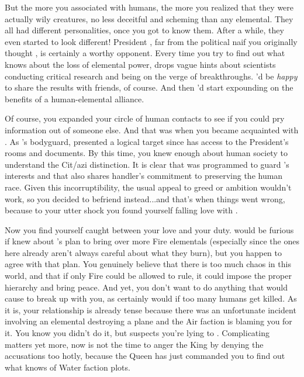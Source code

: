 \documentclass[char]{elementals}
\begin{document}
But the more you associated with humans, the more you realized that they were actually wily creatures, no less deceitful and scheming than any elemental.  They all had different personalities, once you got to know them.  After a while, they even started to look different!  President \cLeader{}, far from the political naif you originally thought \cLeader{\them}, is certainly a worthy opponent.  Every time you try to find out what \cLeader{\they} knows about the loss of elemental power, \cLeader{\they} drops vague hints about \cLeader{\their} scientists conducting critical research and being on the verge of breakthroughs.  \cLeader{\They}'d be \emph{happy} to share the results with \cLeader{\their} friends, of course.  And then \cLeader{\they}'d start expounding on the benefits of a human-elemental alliance.

Of course, you expanded your circle of human contacts to see if you could pry information out of someone else.  And that was when you became acquainted with \cRomeo{}.  As \cLeader{}'s bodyguard, \cRomeo{\they} presented a logical target since \cRomeo{\they} has access to the President's rooms and documents.  By this time, you knew enough about human society to understand the Cit/azi distinction.  It is clear that \cRomeo{\they} was programmed to guard \cLeader{}'s interests and that \cRomeo{\they} also shares \cRomeo{\their} handler's commitment to preserving the human race.  Given this incorruptibility, the usual appeal to greed or ambition wouldn't work, so you decided to befriend \cRomeo{\them} instead...and that's when things went wrong, because to your utter shock you found yourself falling love with \cRomeo{\them}.

Now you find yourself caught between your love and your duty.  \cRomeo{} would be furious if \cRomeo{\they} knew about \cQueen{}'s plan to bring over more Fire elementals (especially since the ones here already aren't always careful about what they burn), but you happen to agree with that plan. You genuinely believe that there is too much chaos in this world, and that if only Fire could be allowed to rule, it could impose the proper hierarchy and bring peace.  And yet, you don't want to do anything that would cause \cRomeo{} to break up with you, as \cRomeo{\they} certainly would if too many humans get killed.  As it is, your relationship is already tense because there was an unfortunate incident involving an elemental destroying a plane and the Air faction is blaming you for it.  You know you didn't do it, but \cRomeo{} suspects you're lying to \cRomeo{\them}.  Complicating matters yet more, now is not the time to anger the King \cKing{} by denying the accusations too hotly, because the Queen has just commanded you to find out what \cKing{\they} knows of Water faction plots.  
\end{document}
